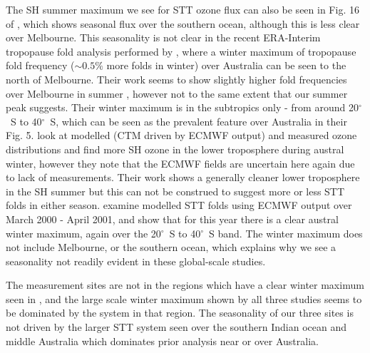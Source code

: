   The SH summer maximum we see for STT ozone flux can also be seen in Fig. 16 of \cite{Skerlak2014}, which shows seasonal flux over the southern ocean, although this is less clear over Melbourne.
  This seasonality is not clear in the recent ERA-Interim tropopause fold analysis performed by \citet{Skerlak2015}, where a winter maximum of tropopause fold frequency ($\sim 0.5\%$ more folds in winter) over Australia can be seen to the north of Melbourne.
  Their work seems to show slightly higher fold frequencies over Melbourne in summer \citep[][Fig. 5]{Skerlak2015}, however not to the same extent that our summer peak suggests.
  Their winter maximum is in the subtropics only - from around 20$^{\circ}$~S to 40$^{\circ}$~S, which can be seen as the prevalent feature over Australia in their Fig. 5.
  \cite{Wauben1998} look at modelled (CTM driven by ECMWF output) and measured ozone distributions and find more SH ozone in the lower troposphere during austral winter, however they note that the ECMWF fields are uncertain here again due to lack of measurements.
  Their work shows a generally cleaner lower troposphere in the SH summer but this can not be construed to suggest more or less STT folds in either season.
  \cite{Sprenger2003} examine modelled STT folds using ECMWF output over March 2000 - April 2001, and show that for this year there is a clear austral winter maximum, again over the 20$^{\circ}$~S to 40$^{\circ}$~S band.
  The winter maximum does not include Melbourne, or the southern ocean, which explains why we see a seasonality not readily evident in these global-scale studies.
  
  The measurement sites are not in the regions which have a clear winter maximum seen in \cite[Fig. 1][]{Sprenger2003}, and the large scale winter maximum shown by all three studies seems to be dominated by the system in that region.
  The seasonality of our three sites is not driven by the larger STT system seen over the southern Indian ocean and middle Australia which dominates prior analysis near or over Australia.
  
